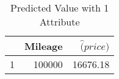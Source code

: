 \begin{table}[ht]
\centering
\begin{tabular}{rrr}
  \hline
 & Mileage & $\hat(price)$ \\ 
  \hline
1 & 100000 & 16676.18 \\ 
   \hline
\end{tabular}
\caption{Predicted Value with 1 Attribute} 
\label{tab:1p_predict}
\end{table}
